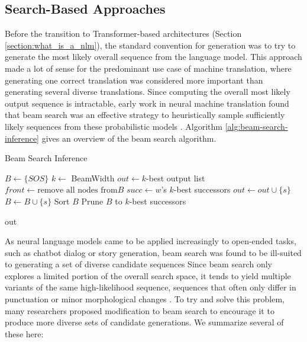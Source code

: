\subsection{Search-Based Approaches}
Before the transition to Transformer-based architectures (Section \ref{section:what_is_a_nlm}), the standard convention for generation was to try to generate the most likely overall sequence from the language model.
This approach made a lot of sense for the predominant use case of machine translation, where generating one correct translation was considered more important than generating several diverse translations.
Since computing the overall most likely output sequence is intractable, early work in neural machine translation found that beam search was an effective strategy to heuristically sample sufficiently likely sequences from these probabilistic models \cite{sutskever2014sequence}.
Algorithm \ref{alg:beam-search-inference} gives an overview of the beam search algorithm. 

\begin{algorithm}
\caption{Beam Search Inference}
\label{alg:beam-search-inference}

\begin{algorithmic}[1]
\State $B \gets \{SOS\}$
\State $k \gets $ BeamWidth
\State $out \gets k$-best output list
    \State $front \gets \text{remove all nodes from} B$
    \State $succ \gets w$'s $k$-best successors
        \State $out \gets out \cup \{s\}$
    \Else
        \State $B \gets B \cup \{s\}$
    \EndIf
    \EndFor
    \EndFor
    \State Sort $B$
        \State Prune $B$ to $k$-best successors
    \EndIf
\EndWhile

\Return out
\EndProcedure
\end{algorithmic}
\end{algorithm}

As neural language models came to be applied increasingly to open-ended tasks, such as chatbot dialog or story generation, beam search was found to be ill-suited to generating a set of diverse candidate sequences
Since beam search only explores a limited portion of the overall search space, it tends to yield multiple variants of the same high-likelihood sequence, sequences that often only differ in punctuation or minor morphological changes \cite{li2016mutual}.  
To try and solve this problem, many researchers proposed modification to beam search to encourage it to produce more diverse sets of candidate generations.
We summarize several of these here:

